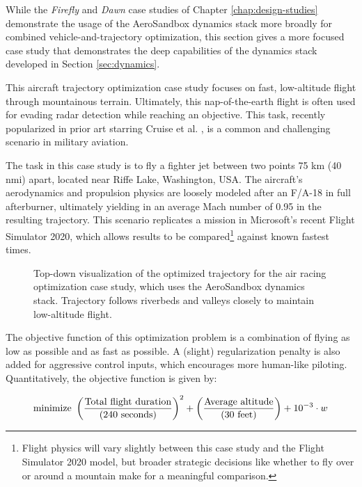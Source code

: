 While the \emph{Firefly} and \emph{Dawn} case studies of Chapter \ref{chap:design-studies} demonstrate the usage of the AeroSandbox dynamics stack more broadly for combined vehicle-and-trajectory optimization, this section gives a more focused case study that demonstrates the deep capabilities of the dynamics stack developed in Section \ref{sec:dynamics}.

This aircraft trajectory optimization case study focuses on fast, low-altitude flight through mountainous terrain. Ultimately, this nap-of-the-earth flight is often used for evading radar detection while reaching an objective. This task, recently popularized in prior art starring Cruise et al. \cite{topgunmaverick2022}, is a common and challenging scenario in military aviation.

The task in this case study is to fly a fighter jet between two points 75 km (40 nmi) apart, located near Riffe Lake, Washington, USA. The aircraft's aerodynamics and propulsion physics are loosely modeled after an F/A-18 in full afterburner, ultimately yielding in an average Mach number of 0.95 in the resulting trajectory. This scenario replicates a mission in Microsoft's recent Flight Simulator 2020, which allows results to be compared\footnote{Flight physics will vary slightly between this case study and the Flight Simulator 2020 model, but broader strategic decisions like whether to fly over or around a mountain make for a meaningful comparison.} against known fastest times.

\begin{figure}[h]
    \centering
    
    \caption{Top-down visualization of the optimized trajectory for the air racing optimization case study, which uses the AeroSandbox dynamics stack. Trajectory follows riverbeds and valleys closely to maintain low-altitude flight.}
    \label{fig:air-racing-trajectory}
\end{figure}

The objective function of this optimization problem is a combination of flying as low as possible and as fast as possible. A (slight) regularization penalty is also added for aggressive control inputs, which encourages more human-like piloting. Quantitatively, the objective function is given by:

\begin{equation}
    \text{minimize }
    \left(
    \frac
    {\text{Total flight duration}}
    {({240\ \rm seconds})}
    \right)^2 +
    \left(
    \frac
    {\text{Average altitude}}
    {({30\ \rm feet})}
    \right) +
    10^{-3} \cdot w
\end{equation}

